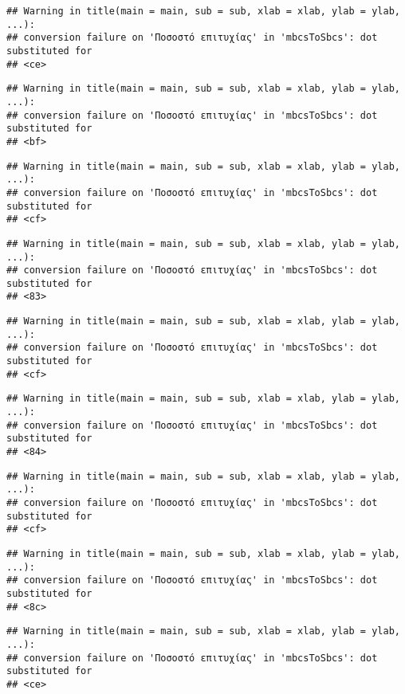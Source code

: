 \documentclass[
]{article}
\begin{document}
\begin{verbatim}
## Warning in title(main = main, sub = sub, xlab = xlab, ylab = ylab, ...):
## conversion failure on 'Ποσοστό επιτυχίας' in 'mbcsToSbcs': dot substituted for
## <ce>
\end{verbatim}

\begin{verbatim}
## Warning in title(main = main, sub = sub, xlab = xlab, ylab = ylab, ...):
## conversion failure on 'Ποσοστό επιτυχίας' in 'mbcsToSbcs': dot substituted for
## <bf>
\end{verbatim}

\begin{verbatim}
## Warning in title(main = main, sub = sub, xlab = xlab, ylab = ylab, ...):
## conversion failure on 'Ποσοστό επιτυχίας' in 'mbcsToSbcs': dot substituted for
## <cf>
\end{verbatim}

\begin{verbatim}
## Warning in title(main = main, sub = sub, xlab = xlab, ylab = ylab, ...):
## conversion failure on 'Ποσοστό επιτυχίας' in 'mbcsToSbcs': dot substituted for
## <83>
\end{verbatim}

\begin{verbatim}
## Warning in title(main = main, sub = sub, xlab = xlab, ylab = ylab, ...):
## conversion failure on 'Ποσοστό επιτυχίας' in 'mbcsToSbcs': dot substituted for
## <cf>
\end{verbatim}

\begin{verbatim}
## Warning in title(main = main, sub = sub, xlab = xlab, ylab = ylab, ...):
## conversion failure on 'Ποσοστό επιτυχίας' in 'mbcsToSbcs': dot substituted for
## <84>
\end{verbatim}

\begin{verbatim}
## Warning in title(main = main, sub = sub, xlab = xlab, ylab = ylab, ...):
## conversion failure on 'Ποσοστό επιτυχίας' in 'mbcsToSbcs': dot substituted for
## <cf>
\end{verbatim}

\begin{verbatim}
## Warning in title(main = main, sub = sub, xlab = xlab, ylab = ylab, ...):
## conversion failure on 'Ποσοστό επιτυχίας' in 'mbcsToSbcs': dot substituted for
## <8c>
\end{verbatim}

\begin{verbatim}
## Warning in title(main = main, sub = sub, xlab = xlab, ylab = ylab, ...):
## conversion failure on 'Ποσοστό επιτυχίας' in 'mbcsToSbcs': dot substituted for
## <ce>
\end{verbatim}
\end{document}
